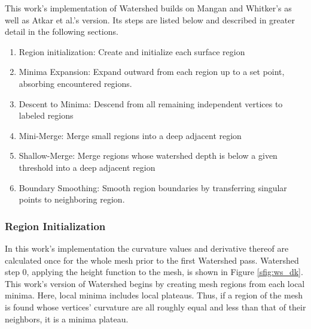 This work's implementation of Watershed builds on Mangan and Whitker's as well as Atkar et al.'s version.
Its steps are listed below and described in greater detail in the following sections.
\begin{enumerate}
	\item Region initialization: Create and initialize each surface region
	\item Minima Expansion: Expand outward from each region up to a set point, absorbing encountered regions.
	\item Descent to Minima: Descend from all remaining independent vertices to labeled regions
	\item Mini-Merge: Merge small regions into a deep adjacent region
	\item Shallow-Merge: Merge regions whose watershed depth is below a given threshold into a deep adjacent region
	\item Boundary Smoothing: Smooth region boundaries by transferring singular points to neighboring region.
\end{enumerate}

\subsubsection{Region Initialization}
In this work's implementation the curvature values and derivative thereof are calculated once for the whole mesh prior to the first Watershed pass.
Watershed step 0, applying the height function to the mesh, is shown in Figure \ref{sfig:ws_dk}.
This work's version of Watershed begins by creating mesh regions from each local minima.
Here, local minima includes local plateaus.
Thus, if a region of the mesh is found whose vertices' curvature are all roughly equal and less than that of their neighbors, it is a minima plateau.

